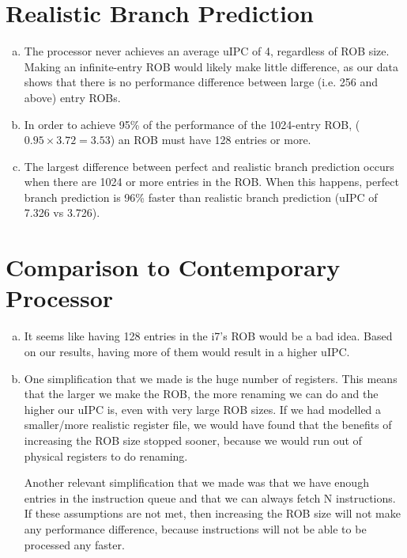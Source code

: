 \documentclass[12pt,twoside]{article}
\begin{document}
\section{Realistic Branch Prediction}
\begin{enumerate}[a)]
\item The processor never achieves an average uIPC of 4, regardless of ROB
  size.  Making an infinite-entry ROB would likely make little difference, as
  our data shows that there is no performance difference between large
  (i.e. 256 and above) entry ROBs.
\item In order to achieve 95\% of the performance of the 1024-entry ROB,
  ($0.95\times 3.72=3.53$) an ROB must have 128 entries or more.
\item The largest difference between perfect and realistic branch prediction
  occurs when there are 1024 or more entries in the ROB.  When this happens,
  perfect branch prediction is 96\% faster than realistic branch prediction
  (uIPC of 7.326 vs 3.726).

\end{enumerate}

\section{Comparison to Contemporary Processor}
\begin{enumerate}[a)]
\item It seems like having 128 entries in the i7's ROB would be a bad idea.
  Based on our results, having more of them would result in a higher uIPC.
\item One simplification that we made is the huge number of registers.  This
  means that the larger we make the ROB, the more renaming we can do and the
  higher our uIPC is, even with very large ROB sizes.  If we had modelled a
  smaller/more realistic register file, we would have found that the benefits
  of increasing the ROB size stopped sooner, because we would run out of
  physical registers to do renaming.

  Another relevant simplification that we made was that we have enough entries
  in the instruction queue and that we can always fetch N instructions.  If
  these assumptions are not met, then increasing the ROB size will not make any
  performance difference, because instructions will not be able to be processed
  any faster.
\end{enumerate}
\end{document}
